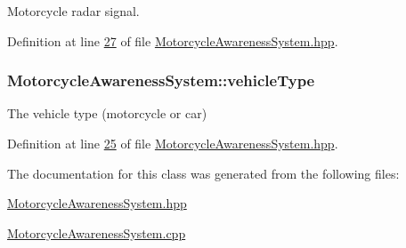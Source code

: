 Motorcycle radar signal. 



Definition at line \hyperlink{MotorcycleAwarenessSystem_8hpp_source_l00027}{27} of file \hyperlink{MotorcycleAwarenessSystem_8hpp_source}{Motorcycle\-Awareness\-System.\-hpp}.

\hypertarget{classMotorcycleAwarenessSystem_a977b2085bfbf6a62902bf2d80160e6d2}{
\subsubsection[{vehicle\-Type}]{ Motorcycle\-Awareness\-System\-::vehicle\-Type\hspace{0.3cm}{\ttfamily [private]}}}\label{classMotorcycleAwarenessSystem_a977b2085bfbf6a62902bf2d80160e6d2}


The vehicle type (motorcycle or car) 



Definition at line \hyperlink{MotorcycleAwarenessSystem_8hpp_source_l00025}{25} of file \hyperlink{MotorcycleAwarenessSystem_8hpp_source}{Motorcycle\-Awareness\-System.\-hpp}.



The documentation for this class was generated from the following files\-:\begin{DoxyCompactItemize}
\item 
\hyperlink{MotorcycleAwarenessSystem_8hpp}{Motorcycle\-Awareness\-System.\-hpp}\item 
\hyperlink{MotorcycleAwarenessSystem_8cpp}{Motorcycle\-Awareness\-System.\-cpp}\end{DoxyCompactItemize}
